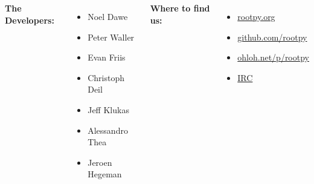 \documentclass[10pt,professionalfonts,serif,usenames,dvipsnames,svgnames,table]{beamer}
\begin{document}
\begin{frame}
    \begin{large}
    \begin{center}
    \begin{columns}
{\bf The Developers:}
\vspace{.5cm}
\begin{itemize}
    \item Noel Dawe
    \item Peter Waller
    \item Evan Friis
    \item Christoph Deil
    \item Jeff Klukas
    \item Alessandro Thea
    \item Jeroen Hegeman
\end{itemize}
{\bf Where to find us:}
\vspace{.5cm}
        \begin{itemize}
            \item \href{http://rootpy.org}{rootpy.org}
            \item \href{https://github.com/rootpy}{github.com/rootpy}
            \item \href{http://www.ohloh.net/p/rootpy}{ohloh.net/p/rootpy}
            \item \href{http://webchat.freenode.net/?randomnick=1&channels=rootpy&prompt=1}{IRC}
            \end{itemize}
        \end{columns}
    \end{center}
    \end{large}
\end{frame}
\end{document}
